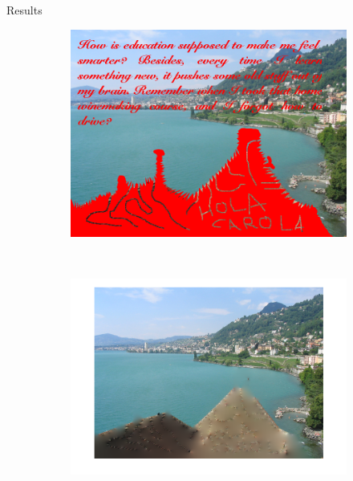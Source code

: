 \documentclass[11pt]{beamer}
\begin{document}
\begin{frame}{Results}
\begin{figure}
    \centering
    \begin{subfigure}[b]{0.45\textwidth}
        \includegraphics[width=\textwidth]{Image_to_Restore}

    \end{subfigure}
    ~ 
        \begin{subfigure}[b]{0.55\textwidth}
        \includegraphics[width=\textwidth]{Image_Restored}

    \end{subfigure}

\end{figure}

\end{frame}
\end{document}

